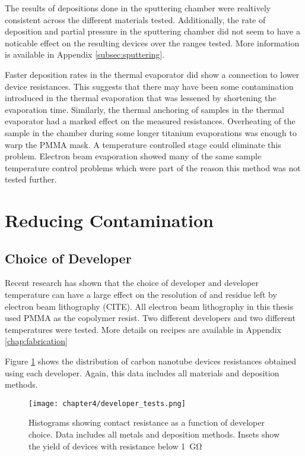 The results of depositions done in the sputtering chamber were realtively consistent across the different materials tested. Additionally, the rate of deposition and partial pressure in the sputtering chamber did not seem to have a noticable effect on the resulting devices over the ranges tested. More information is available in Appendix \ref{subsec:sputtering}. 

Faster deposition rates in the thermal evaporator did show a connection to lower device resistances. This suggests that there may have been some contamination introduced in the thermal evaporation that was lessened by shortening the evaporation time. Similarly, the thermal anchoring of samples in the thermal evaporator had a marked effect on the measured resistances. Overheating of the sample in the chamber during some longer titanium evaporations was enough to warp the PMMA mask. A temperature controlled stage could eliminate this problem. Electron beam evaporation showed many of the same sample temperature control problems which were part of the reason this method was not tested further.

\section{Reducing Contamination}

\subsection{Choice of Developer}
\label{subsec:developer_choice}

Recent research has shown that the choice of developer and developer temperature can have a large effect on the resolution of and residue left by electron beam lithography (CITE). All electron beam lithography in this thesis used PMMA as the copolymer resist. Two different developers and two different temperatures were tested. More details on recipes are available in Appendix \ref{chap:fabrication}

Figure \ref{fig:developer_tests} shows the distribution of carbon nanotube devices resistances obtained using each developer. Again, this data includes all materials and deposition methods.

\begin{figure}
    \centering
    \texttt{[image: chapter4/developer\_tests.png]}
    \caption{Histograms showing contact resistance as a function of developer choice. Data includes all metals and deposition methods. Insets show the yield of devices with resistance below \SI{1}{\giga\ohm}}
    \label{fig:developer_tests}
\end{figure}

